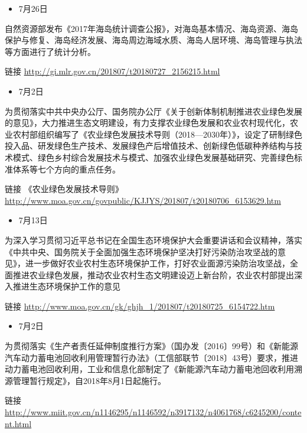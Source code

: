 \documentclass[]{book}
\providecommand{\tightlist}{%
  \setlength{\itemsep}{0pt}\setlength{\parskip}{0pt}}
\begin{document}
\begin{itemize}
\tightlist
\item
  7月26日
\end{itemize}

自然资源部发布《2017年海岛统计调查公报》，对海岛基本情况、海岛资源、海岛保护与修复、海岛经济发展、海岛周边海域水质、海岛人居环境、海岛管理与执法等方面进行了统计分析。

链接 \url{http://gi.mlr.gov.cn/201807/t20180727_2156215.html}

\begin{itemize}
\tightlist
\item
  7月2日
\end{itemize}

为贯彻落实中共中央办公厅、国务院办公厅《关于创新体制机制推进农业绿色发展的意见》，大力推进生态文明建设，有力支撑农业绿色发展和农业农村现代化，农业农村部组织编写了《农业绿色发展技术导则（2018---2030年）》，设定了研制绿色投入品、研发绿色生产技术、发展绿色产后增值技术、创新绿色低碳种养结构与技术模式、绿色乡村综合发展技术与模式、加强农业绿色发展基础研究、完善绿色标准体系等七个方向的重点任务。

链接 《农业绿色发展技术导则》\url{http://www.moa.gov.cn/govpublic/KJJYS/201807/t20180706_6153629.htm}

\begin{itemize}
\tightlist
\item
  7月13日
\end{itemize}

为深入学习贯彻习近平总书记在全国生态环境保护大会重要讲话和会议精神，落实《中共中央、国务院关于全面加强生态环境保护坚决打好污染防治攻坚战的意见》，进一步做好农业农村生态环境保护工作，打好农业面源污染防治攻坚战，全面推进农业绿色发展，推动农业农村生态文明建设迈上新台阶，农业农村部提出深入推进生态环境保护工作的意见

链接 \url{http://www.moa.gov.cn/gk/ghjh_1/201807/t20180725_6154722.htm}

\begin{itemize}
\tightlist
\item
  7月2日
\end{itemize}

为贯彻落实《生产者责任延伸制度推行方案》（国办发〔2016〕99号）和《新能源汽车动力蓄电池回收利用管理暂行办法》（工信部联节〔2018〕43号）要求，推进动力蓄电池回收利用，工业和信息化部制定了《新能源汽车动力蓄电池回收利用溯源管理暂行规定》，自2018年8月1日起施行。

链接 \url{http://www.miit.gov.cn/n1146295/n1146592/n3917132/n4061768/c6245200/content.html}
\end{document}
